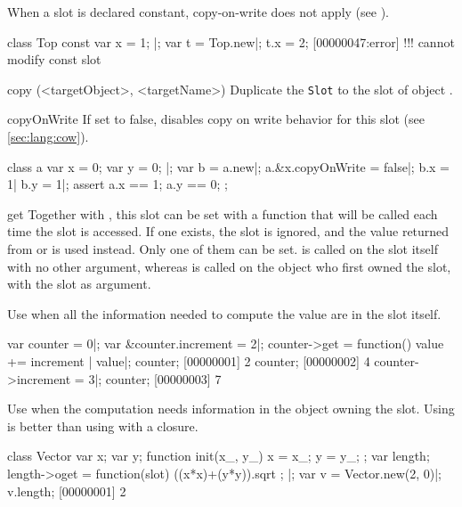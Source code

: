 \begin{urbiscriptapi}
When a slot is declared constant, copy-on-write does not apply (see
).

\begin{urbiscript}
class Top
{
  const var x = 1;
}|;
var t = Top.new|;
t.x = 2;
[00000047:error] !!! cannot modify const slot
\end{urbiscript}


\item[copy](<targetObject>, <targetName>)%
  Duplicate the \lstinline|Slot| to the slot  of object
  .

\item[copyOnWrite]%
  If set to false, disables copy on write behavior for this slot
  (see \autoref{sec:lang:cow}).

\begin{urbiscript}
class a {
  var x = 0;
  var y = 0;
}|;
var b = a.new|;
a.&x.copyOnWrite = false|;
b.x = 1| b.y = 1|;
assert
{
  a.x == 1;
  a.y == 0;
};
\end{urbiscript}

\item[get]%
  Together with , this slot can be set with a function that will
  be called each time the slot
  is accessed. If one exists, the  slot is ignored, and the
  value returned from  or  is used instead.
  Only one of them can be set.  is called on the slot itself with
  no other argument, whereas  is called on the object who first
  owned the slot, with the slot as argument.

  Use  when all the information needed to compute the value are
  in the slot itself.

\begin{urbiscript}
var counter = 0|;
var &counter.increment = 2|;
counter->get = function()
{ value += increment | value}|;
counter;
[00000001] 2
counter;
[00000002] 4
counter->increment = 3|;
counter;
[00000003] 7
\end{urbiscript}

Use  when the computation needs information in the object
owning the slot. Using  is better than using  with
a closure.

\begin{urbiscript}
class Vector
{
  var x;
  var y;
  function init(x_, y_)
  {
    x = x_;
    y = y_;
  };
  var length;
  length->oget = function(slot)
  {
    ((x*x)+(y*y)).sqrt
  };
}|;
var v = Vector.new(2, 0)|;
v.length;
[00000001] 2
\end{urbiscript}


\end{urbiscriptapi}
